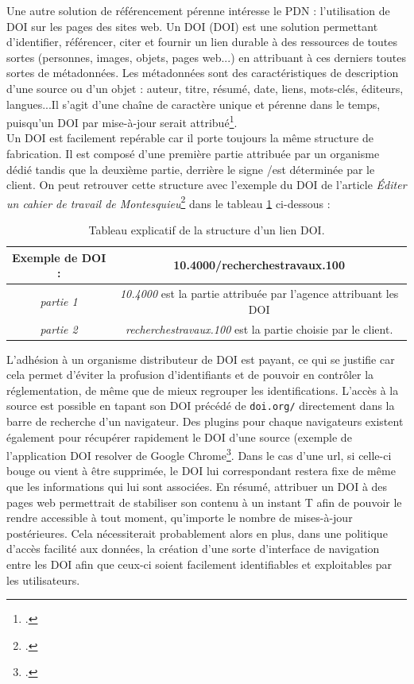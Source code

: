 \documentclass[a4paper,12pt,twoside]{book}
\begin{document}
Une autre solution de référencement pérenne intéresse le \acrshort{PDN} : l'utilisation de DOI sur les pages des sites web. Un DOI (\acrlong{DOI}) est une solution permettant d'identifier, référencer, citer et fournir un lien durable à des ressources de toutes sortes (personnes, images, objets, pages web...) en attribuant à ces derniers toutes sortes de métadonnées. Les métadonnées sont des caractéristiques de description d'une source ou d'un objet : auteur, titre, résumé, date, liens, mots-clés, éditeurs, langues...Il s'agit d'une chaîne de caractère unique et pérenne dans le temps, puisqu'un DOI par mise-à-jour serait attribué\footcite{DOI}. \\
   Un DOI est facilement repérable car il porte toujours la même structure de fabrication. Il est composé d'une première partie attribuée par un organisme dédié tandis que la deuxième partie, derrière le signe \og /\fg est déterminée par le client. On peut retrouver cette structure avec l'exemple du DOI de l'article \og \textit{Éditer un cahier de travail de Montesquieu}\footcite{montesquieu}\fg{} dans le tableau \ref{DOI} ci-dessous :
   
   \begin{table}[H]
\centering
\begin{tabular}{|c|c|}
\hline
 \cellcolor{lightgray}Exemple de DOI : &  \textbf{10.4000/recherchestravaux.100} \\
\hline
\textit{partie 1} & \textit{10.4000} est la partie attribuée par l'agence attribuant les DOI \\
\hline
\textit{partie 2} & \textit{recherchestravaux.100} est la partie choisie par le client. \\
\hline
\end{tabular}
\caption{Tableau explicatif de la structure d'un lien DOI.}
\label{DOI}
\end{table}

L'adhésion à un organisme distributeur de DOI est payant, ce qui se justifie car cela permet d'éviter la profusion d'identifiants et de pouvoir en contrôler la réglementation, de même que de mieux regrouper les identifications. L'accès à la source est possible en tapant son DOI précédé de \texttt{doi.org/} directement dans la barre de recherche d'un navigateur. Des plugins pour chaque navigateurs existent également pour récupérer rapidement le DOI d'une source (exemple de l'application \og DOI resolver \fg de Google Chrome\footcite{doi-resolver}. Dans le cas d'une url, si celle-ci bouge ou vient à être supprimée, le DOI lui correspondant restera fixe de même que les informations qui lui sont associées. En résumé, attribuer un DOI à des pages web permettrait de stabiliser son contenu à un instant T afin de pouvoir le rendre accessible à tout moment, qu'importe le nombre de mises-à-jour postérieures. Cela nécessiterait probablement alors en plus, dans une politique d'accès facilité aux données, la création d'une sorte d'interface de navigation entre les DOI afin que ceux-ci soient facilement identifiables et exploitables par les utilisateurs.
\end{document}

